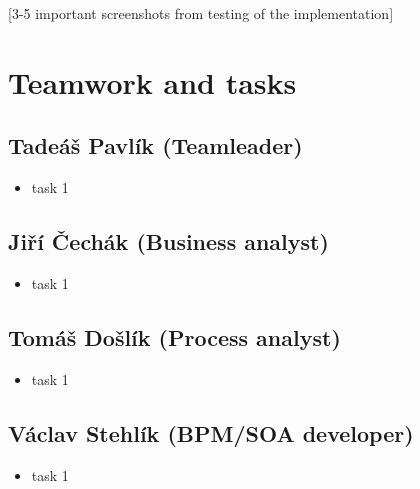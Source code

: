 \documentclass[11pt,a4paper]{article}
\begin{document}
[3-5 important screenshots from testing of the implementation]


\section{Teamwork and tasks}

\subsection{Tadeáš Pavlík (Teamleader)}

\begin{itemize}
    \item task 1
\end{itemize}

\subsection{Jiří Čechák (Business analyst)}

\begin{itemize}
    \item task 1
\end{itemize}

\subsection{Tomáš Došlík (Process analyst)}

\begin{itemize}
    \item task 1
\end{itemize}

\subsection{Václav Stehlík (BPM/SOA developer)}

\begin{itemize}
    \item task 1
\end{itemize}
\end{document}
